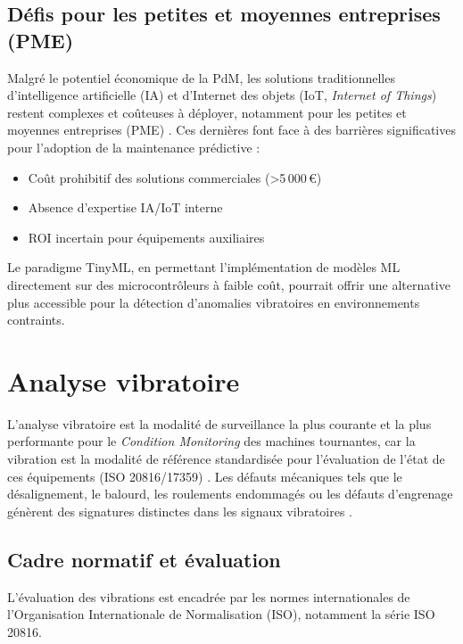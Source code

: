 \subsection{Défis pour les petites et moyennes entreprises (PME)}

Malgré le potentiel économique de la PdM, les solutions traditionnelles d'intelligence artificielle (IA) et d'Internet des objets (IoT, \textit{Internet of Things}) restent complexes et coûteuses à déployer, notamment pour les petites et moyennes entreprises (PME) \cite{siemens2024}. Ces dernières font face à des barrières significatives pour l'adoption de la maintenance prédictive \cite{oecd2021} :
\begin{itemize}
\item Coût prohibitif des solutions commerciales (>5\,000\,€)
\item Absence d'expertise IA/IoT interne
\item ROI incertain pour équipements auxiliaires
\end{itemize}

Le paradigme TinyML, en permettant l'implémentation de modèles ML directement sur des microcontrôleurs à faible coût, pourrait offrir une alternative plus accessible pour la détection d'anomalies vibratoires en environnements contraints.

\section{Analyse vibratoire}
\label{sec:analyse_vibratoire}

L'analyse vibratoire est la modalité de surveillance la plus courante et la plus performante pour le \textit{Condition Monitoring} des machines tournantes, car la vibration est la modalité de référence standardisée pour l'évaluation de l'état de ces équipements (ISO 20816/17359) \cite{iso20816-1,hassan2024}. Les défauts mécaniques tels que le désalignement, le balourd, les roulements endommagés ou les défauts d'engrenage génèrent des signatures distinctes dans les signaux vibratoires \cite{tiboni2022}.

\subsection{Cadre normatif et évaluation}

L'évaluation des vibrations est encadrée par les normes internationales de l'Organisation Internationale de Normalisation (ISO), notamment la série ISO 20816.

